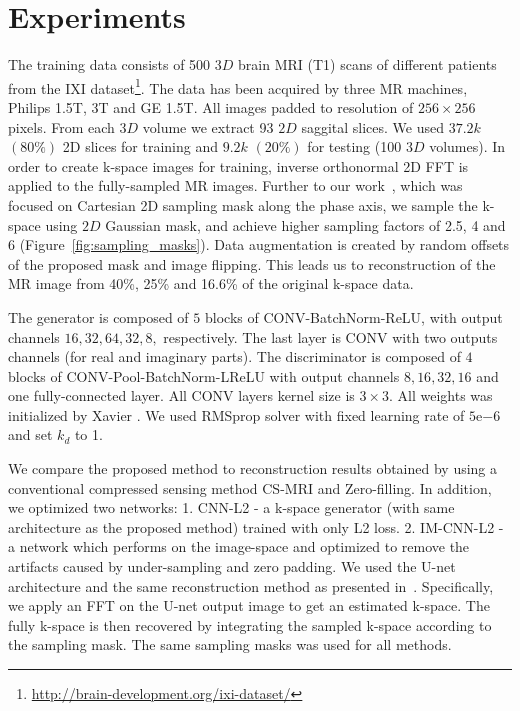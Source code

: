 \documentclass[review]{elsarticle}
\begin{document}
\section{Experiments}\label{experiments_section}

The training data consists of 500 $3D$ brain MRI (T1) scans of different patients from the IXI dataset\footnote{\url{http://brain-development.org/ixi-dataset/}}. The data has been acquired by three MR machines, Philips 1.5T, 3T and GE 1.5T. All images padded to resolution of $256\times256$ pixels.
From each $3D$ volume we extract 93 $2D$ saggital slices. We used $37.2k$ $(80\%)$ 2D slices for training and $9.2k$ $(20\%)$ for testing (100 $3D$ volumes).
In order to create k-space images for training, inverse orthonormal
2D FFT is applied to the fully-sampled MR images. 
Further to our work~\cite{shitrit2017accelerated}, which was focused on Cartesian 2D sampling mask along the phase axis, we sample the k-space using $2D$ Gaussian mask, and achieve higher sampling factors of 2.5, 4 and 6 (Figure~\ref{fig:sampling_masks}).
Data augmentation is created by random offsets of the proposed mask and image flipping. This leads us to reconstruction of the MR image from 40\%, 25\% and 16.6\% of the original k-space data.

The generator is composed of $5$ blocks of CONV-BatchNorm-ReLU, with output channels $16,32,64,32,8,$ respectively. The last layer is CONV with two outputs channels (for real and imaginary parts). The discriminator is composed of $4$ blocks of CONV-Pool-BatchNorm-LReLU with output channels $8,16,32,16$ and one fully-connected layer. All CONV layers kernel size is $3\times3$. All weights was initialized by Xavier \cite{glorot2010understanding}. We used RMSprop solver with fixed learning rate of $5\mathrm{e}{-6}$ and set $k_{d}$ to 1.

We compare the proposed method to reconstruction results obtained by using a conventional compressed sensing method CS-MRI \cite{lustig2007sparse} and Zero-filling. In addition, we optimized two networks: 1. CNN-L2 - a k-space generator (with same architecture as the proposed method) trained with only L2 loss. 2. IM-CNN-L2 - a network which performs on the image-space and optimized to remove the artifacts caused by under-sampling and zero padding. 
We used the U-net \cite{ronneberger2015u} architecture and the same reconstruction method as presented in~\cite{hyun2017deep}. Specifically, we apply an FFT on the U-net output image to get an estimated k-space. The fully k-space is then recovered by integrating the sampled k-space according to the sampling mask. The same sampling masks was used for all methods.
\end{document}
